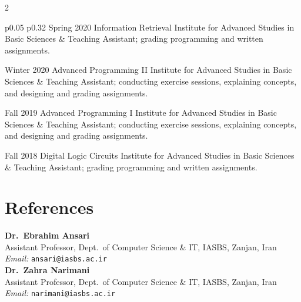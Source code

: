 \documentclass[
	8pt, %
]{FreemanCV}
\begin{document}
\begin{paracol}{2}
{\begin{supertabular}{p{0.05\textwidth} p{0.32\textwidth}}
	\qualificationentry
		{Spring 2020}
		{Information Retrieval}
		{}
		{Institute for Advanced Studies in Basic Sciences}
		{& Teaching Assistant; grading programming and written assignments.}


	\qualificationentry
		{Winter 2020}
		{Advanced Programming II}
		{}
		{Institute for Advanced Studies in Basic Sciences}
		{& Teaching Assistant; conducting exercise sessions, explaining concepts, and designing and grading assignments.}


	\qualificationentry
		{Fall 2019}
		{Advanced Programming I}
		{}
		{Institute for Advanced Studies in Basic Sciences}
		{& Teaching Assistant; conducting exercise sessions, explaining concepts, and designing and grading assignments.}


	\qualificationentry
		{Fall 2018}
		{Digital Logic Circuits}
		{}
		{Institute for Advanced Studies in Basic Sciences}
		{& Teaching Assistant; grading programming and written assignments.}


\end{supertabular}
}
\section{References}

\noindent
    \textbf{Dr.\ Ebrahim Ansari}\\
    Assistant Professor, Dept.\ of Computer Science \& IT, IASBS, Zanjan, Iran\\
    \textit{Email:} \texttt{ansari@iasbs.ac.ir}\\
  
    \textbf{Dr.\ Zahra Narimani}\\
    Assistant Professor, Dept.\ of Computer Science \& IT, IASBS, Zanjan, Iran\\
    \textit{Email:} \texttt{narimani@iasbs.ac.ir}\\


\end{paracol}
\end{document}
